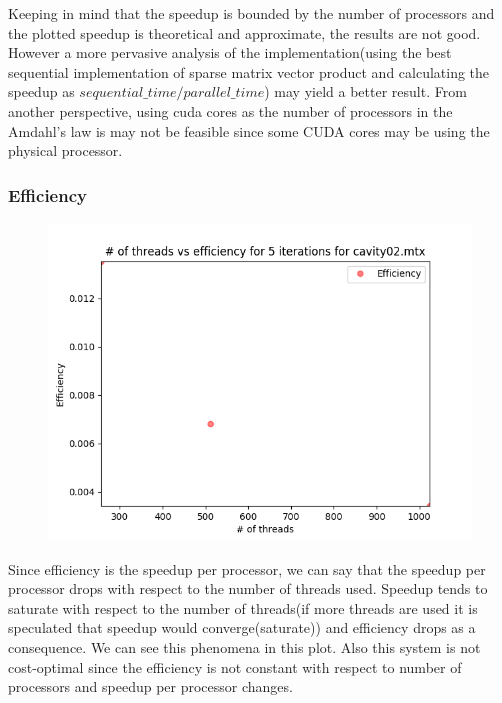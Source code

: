 \documentclass{article}
\begin{document}
\null \qquad Keeping in mind that the speedup is bounded by the number of processors and the plotted speedup is theoretical and approximate, the results are not good. However a more pervasive analysis of the implementation(using the best sequential implementation of sparse matrix vector product and calculating the speedup as $sequential\_time / parallel\_time$) may yield a better result. From another perspective, using cuda cores as the number of processors in the Amdahl's law is may not be feasible since some CUDA cores may be using the physical processor.

\subsubsection{Efficiency}

\begin{figure}[H]
\centering
\includegraphics[width=\linewidth]{assets/cavity_thr_eff.png}
\label{fig:test1}
\vspace{-2pt}
\end{figure}

\null \qquad Since efficiency is the speedup per processor, we can say that the speedup per processor drops with respect to the number of threads used.  Speedup tends to saturate with respect to the number of threads(if more threads are used it is speculated that speedup would converge(saturate)) and efficiency drops as a consequence. We can see this phenomena in this plot. Also this system is not cost-optimal since the efficiency is not constant with respect to number of processors and speedup per processor changes.
\end{document}
